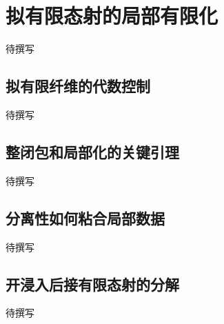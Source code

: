 
% 
% 

\section{拟有限态射的局部有限化}
\label{g5:sec:1203}

待撰写

\subsection{拟有限纤维的代数控制}
\label{g5:subsec:1203:01}
待撰写

\subsection{整闭包和局部化的关键引理}
\label{g5:subsec:1203:02}
待撰写

\subsection{分离性如何粘合局部数据}
\label{g5:subsec:1203:03}
待撰写

\subsection{开浸入后接有限态射的分解}
\label{g5:subsec:1203:04}
待撰写
